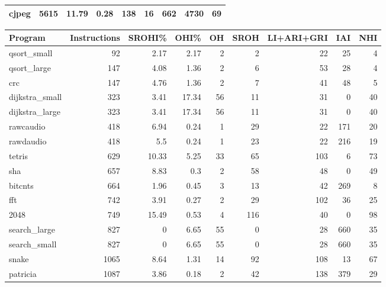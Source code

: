 \begin{tabular}{lrrrrrrrr}
 cjpeg          &     5615 &    11.79 &   0.28 &  138 &   16 &    662 &  4730 &    69 \\
\hline
\end{tabular}\begin{tabular}{lrrrrrrrr}
\hline
 Program        &   Instructions &   SROHI\% &   OHI\% &   OH &   SROH &   LI+ARI+GRI &   IAI &   NHI \\
\hline
 qsort\_small    &             92 &     2.17 &   2.17 &    2 &      2 &           22 &    25 &     4 \\
 qsort\_large    &            147 &     4.08 &   1.36 &    2 &      6 &           53 &    28 &     4 \\
 crc            &            147 &     4.76 &   1.36 &    2 &      7 &           41 &    48 &     5 \\
 dijkstra\_small &            323 &     3.41 &  17.34 &   56 &     11 &           31 &     0 &    40 \\
 dijkstra\_large &            323 &     3.41 &  17.34 &   56 &     11 &           31 &     0 &    40 \\
 rawcaudio      &            418 &     6.94 &   0.24 &    1 &     29 &           22 &   171 &    20 \\
 rawdaudio      &            418 &     5.5  &   0.24 &    1 &     23 &           22 &   216 &    19 \\
 tetris         &            629 &    10.33 &   5.25 &   33 &     65 &          103 &     6 &    73 \\
 sha            &            657 &     8.83 &   0.3  &    2 &     58 &           48 &     0 &    49 \\
 bitcnts        &            664 &     1.96 &   0.45 &    3 &     13 &           42 &   269 &     8 \\
 fft            &            742 &     3.91 &   0.27 &    2 &     29 &          102 &    36 &    25 \\
 2048           &            749 &    15.49 &   0.53 &    4 &    116 &           40 &     0 &    98 \\
 search\_large   &            827 &     0    &   6.65 &   55 &      0 &           28 &   660 &    35 \\
 search\_small   &            827 &     0    &   6.65 &   55 &      0 &           28 &   660 &    35 \\
 snake          &           1065 &     8.64 &   1.31 &   14 &     92 &          108 &    13 &    67 \\
 patricia       &           1087 &     3.86 &   0.18 &    2 &     42 &          138 &   379 &    29 \\

\end{tabular}
